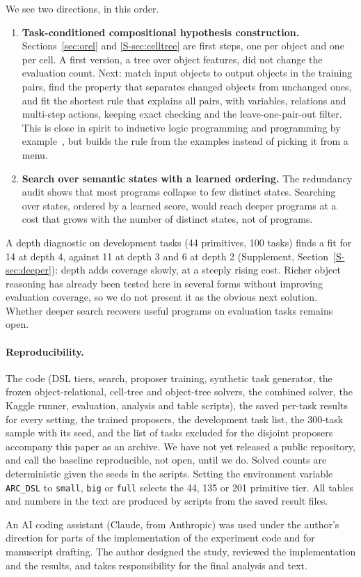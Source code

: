 \documentclass[sigconf,nonacm]{acmart}
\begin{document}
\label{sec:next}We see two directions, in this order.
\begin{enumerate}
  \item \textbf{Task-conditioned compositional hypothesis construction.} Sections~\ref{sec:orel} and \ref{S-sec:celltree} are first steps, one per object and one per cell. A first version, a tree over object features, did not change the evaluation count. Next: match input objects to output objects in the training pairs, find the property that separates changed objects from unchanged ones, and fit the shortest rule that explains all pairs, with variables, relations and multi-step actions, keeping exact checking and the leave-one-pair-out filter. This is close in spirit to inductive logic programming and programming by example~\cite{gulwani2011flashfill}, but builds the rule from the examples instead of picking it from a menu.
  \item \textbf{Search over semantic states with a learned ordering.} The redundancy audit shows that most programs collapse to few distinct states. Searching over states, ordered by a learned score, would reach deeper programs at a cost that grows with the number of distinct states, not of programs.
\end{enumerate}
A depth diagnostic on development tasks (44 primitives, 100 tasks) finds a fit for 14 at depth 4, against 11 at depth 3 and 6 at depth 2 (Supplement, Section~\ref{S-sec:deeper}): depth adds coverage slowly, at a steeply rising cost. Richer object reasoning has already been tested here in several forms without improving evaluation coverage, so we do not present it as the obvious next solution. Whether deeper search recovers useful programs on evaluation tasks remains open.

\paragraph{Reproducibility.} The code (DSL tiers, search, proposer training, synthetic task generator, the frozen object-relational, cell-tree and object-tree solvers, the combined solver, the Kaggle runner, evaluation, analysis and table scripts), the saved per-task results for every setting, the trained proposers, the development task list, the 300-task sample with its seed, and the list of tasks excluded for the disjoint proposers accompany this paper as an archive. We have not yet released a public repository, and call the baseline reproducible, not open, until we do. Solved counts are deterministic given the seeds in the scripts. Setting the environment variable \texttt{ARC\_DSL} to \texttt{small}, \texttt{big} or \texttt{full} selects the 44, 135 or 201 primitive tier. All tables and numbers in the text are produced by scripts from the saved result files.

\begin{acks}
An AI coding assistant (Claude, from Anthropic) was used under the author's direction for parts of the implementation of the experiment code and for manuscript drafting. The author designed the study, reviewed the implementation and the results, and takes responsibility for the final analysis and text.
\end{acks}



\end{document}
